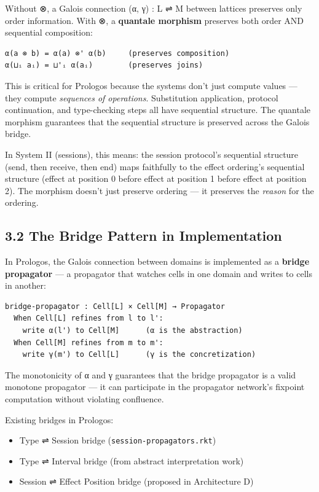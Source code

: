 \documentclass[11pt]{article}
\begin{document}
Without ⊗, a Galois connection (α, γ) : L ⇌ M between lattices preserves only
order information. With ⊗, a \textbf{quantale morphism} preserves both order AND
sequential composition:

\begin{verbatim}
α(a ⊗ b) = α(a) ⊗' α(b)     (preserves composition)
α(⊔ᵢ aᵢ) = ⊔'ᵢ α(aᵢ)        (preserves joins)
\end{verbatim}

This is critical for Prologos because the systems don't just compute values —
they compute \emph{sequences of operations}. Substitution application, protocol
continuation, and type-checking steps all have sequential structure. The quantale
morphism guarantees that the sequential structure is preserved across the Galois
bridge.

In System II (sessions), this means: the session protocol's sequential structure
(send, then receive, then end) maps faithfully to the effect ordering's
sequential structure (effect at position 0 before effect at position 1 before
effect at position 2). The morphism doesn't just preserve ordering — it preserves
the \emph{reason} for the ordering.
\subsection{3.2 The Bridge Pattern in Implementation}
\label{sec:org9fa435e}

In Prologos, the Galois connection between domains is implemented as a
\textbf{bridge propagator} — a propagator that watches cells in one domain and writes
to cells in another:

\begin{verbatim}
bridge-propagator : Cell[L] × Cell[M] → Propagator
  When Cell[L] refines from l to l':
    write α(l') to Cell[M]      (α is the abstraction)
  When Cell[M] refines from m to m':
    write γ(m') to Cell[L]      (γ is the concretization)
\end{verbatim}

The monotonicity of α and γ guarantees that the bridge propagator is a valid
monotone propagator — it can participate in the propagator network's fixpoint
computation without violating confluence.

Existing bridges in Prologos:
\begin{itemize}
\item Type ⇌ Session bridge (\texttt{session-propagators.rkt})
\item Type ⇌ Interval bridge (from abstract interpretation work)
\item Session ⇌ Effect Position bridge (proposed in Architecture D)
\end{itemize}
\end{document}
